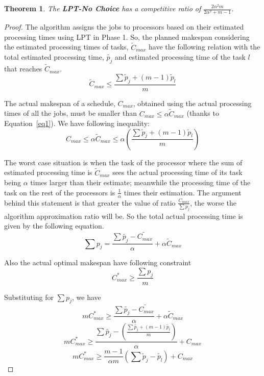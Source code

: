 \documentclass[10pt, conference, compsocconf]{IEEEtran}
\newtheorem{theorem}{Theorem}[section]
\begin{document}
\begin{theorem}
The \textbf{LPT-No Choice} has a competitive ratio of $ \frac{2\alpha^{2}m}{2\alpha^{2}+ m-1}$.
\end{theorem} 

\begin{proof}
  The algorithm assigns the jobs to processors based on their
  estimated processing times using LPT in Phase 1. So, the
  planned makespan considering the estimated processing times of tasks,
  $\tilde{C}_{max}$ have the following relation with the total
  estimated processing time, $\tilde{p_j}$ and estimated processing
  time of the task  $l$ that reaches $\tilde{C}_{max}$.
\begin{equation}\label{eq2}
\tilde C_{max}\leq  \frac{\sum{\tilde p_j + (m-1) \tilde p_l} }{m}
\end{equation}

The actual makespan of a schedule, $C_{max}$, obtained using the
actual processing times of all the jobs, must be smaller than $C_{max} \leq \alpha
\tilde C_{max}$ (thanks to Equation~\ref{eq1}). We
have following inequality:
\begin{equation}\label{eq3}
  C_{max}\leq \alpha \tilde C_{max}\leq \alpha \left ( \frac{\sum{\tilde p_j + (m-1) \tilde p_l} }{m} \right )
\end{equation} 

The worst case situation is when the task of the processor where the
sum of estimated processing time is $\tilde C_{max}$ sees the actual
processing time of its task being $\alpha$ times larger than their
estimate; meanwhile the processing time of the task on the rest of the
processors is $\frac{1}{\alpha}$ times their estimation. The argument
behind this statement is that greater the value of ratio
$\frac{C_{max}}{\sum{p_j}}$, the worse the algorithm approximation
ratio will be. So the total actual processing time is
given by the following equation.
 \begin{equation}\label{eq4}
 \sum {p_j} = \frac{\sum \tilde{p_j}- \tilde{C_{max}}}{\alpha} + \alpha \tilde C_{max}
 \end{equation}
 
 Also the actual optimal makespan have following constraint
 \begin{equation}\nonumber 
C_{max}^{*}\geq \frac{\sum {p_j}}{m}
\end{equation}

Substituting for  $ \sum {p_j}$, we have
 \begin{equation}\nonumber 
 m C_{max}^{*}\geq \frac{\sum \tilde{p_j}- \tilde{C_{max}}}{\alpha} + \alpha \tilde C_{max}
 \end{equation} 
\begin{equation}\nonumber 
 m C_{max}^{*}\geq \frac{\sum \tilde{p_j} - \left( \frac{\sum{\tilde{p_j} + (m-1) \tilde{p_l} }}{m} \right )} {\alpha} + {C_{max}}
\end{equation}
\begin{equation}\nonumber
 m C_{max}^{*}\geq \frac{m-1}{\alpha m} \left( \sum \tilde p_j - \tilde{p_l} \right) + {C_{max}}
 \end{equation}


\end{proof}
\end{document}
